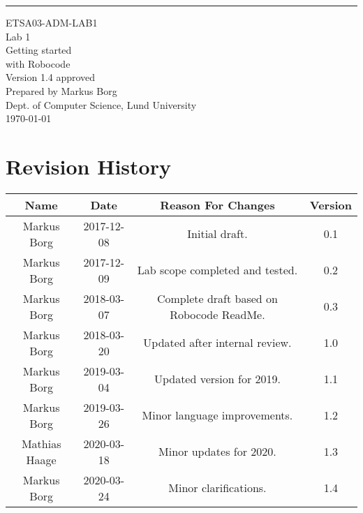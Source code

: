 \documentclass{scrreprt}
\date{}
\def\myversion{1.4 }
\begin{document}
\begin{flushright}
    \rule{16cm}{5pt}\vskip1cm
    \begin{bfseries}
    	\LARGE{ETSA03-ADM-LAB1}\\
    	\vspace{1.5cm}
        \Huge{Lab 1}\\
        \vspace{0.5cm}
        Getting started\\
        \vspace{0.5cm}
        with Robocode\\
        \vspace{1.5cm}
        \LARGE{Version \myversion approved}\\
        \vspace{1.5cm}
        Prepared by Markus Borg\\
        Dept. of Computer Science, Lund University\\
        \vspace{1.5cm}
        \today\\
    \end{bfseries}
\end{flushright}


\chapter*{Revision History}

\begin{center}
    \begin{tabular}{|c|c|c|c|}
        \hline
	    Name & Date & Reason For Changes & Version\\
        \hline
	    Markus Borg & 2017-12-08 & Initial draft. & 0.1\\
        \hline
        Markus Borg & 2017-12-09 & Lab scope completed and tested. & 0.2\\
        \hline
        Markus Borg & 2018-03-07 & Complete draft based on Robocode ReadMe. & 0.3\\
        \hline
        Markus Borg & 2018-03-20 & Updated after internal review. & 1.0\\
        \hline
        Markus Borg & 2019-03-04 & Updated version for 2019. & 1.1\\
        \hline
        Markus Borg & 2019-03-26 & Minor language improvements. & 1.2\\
        \hline
        Mathias Haage & 2020-03-18 & Minor updates for 2020. & 1.3\\
        \hline
        Markus Borg & 2020-03-24 & Minor clarifications. & 1.4\\
        \hline
    \end{tabular}
\end{center}
\end{document}
